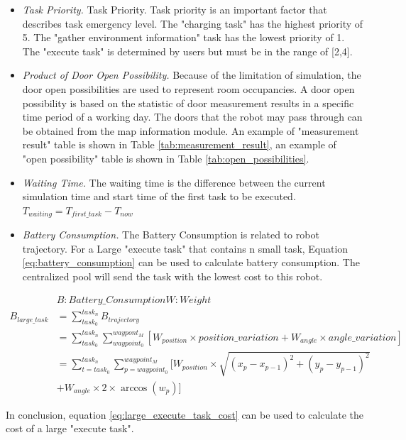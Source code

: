 \begin{itemize}
\item \textsl{Task Priority.} Task Priority. Task priority is an important factor that describes task emergency level. The "charging task" has the highest priority of 5. The "gather environment information" task has the lowest priority of 1. 
	The "execute task" is determined by users but must be in the range of [2,4]. 
\item \textsl{Product of Door Open Possibility.} Because of the limitation of simulation, the door open possibilities are used to represent room occupancies. A door open possibility is based on the statistic of door measurement results in a specific time period of a working day. 
	The doors that the robot may pass through can be obtained from the map information module.
	An example of "measurement result" table is shown in Table \ref{tab:measurement_result}, an example of "open possibility" table is shown in Table \ref{tab:open_possibilities}. 
\item \textsl{Waiting Time. } The waiting time is the difference between the current simulation time and start time of the first task to be executed. $T_{waiting} = T_{first\_task} - T_{now}$
\item \textsl{Battery Consumption.} The Battery Consumption is related to robot trajectory. For a Large "execute task" that contains n small task, Equation \ref{eq:battery_consumption} can be used to calculate battery consumption. The centralized pool will send the task with the lowest cost to this robot.
\end{itemize}
\begin{equation}
\begin{aligned}
\label{eq:battery_consumption}
&B: Battery\_Consumption W: Weight\\
B_{large\_task} & = \sum_{task_0}^{task_n} B_{trajectory} \\
& = \sum_{task_0}^{task_n} \sum_{waypoint_0}^{waypont_M} [W_{position} \times position\_variation+W_{angle}  \times angle\_variation]\\
& = \sum_{t = task_0}^{task_n} \sum_{p = waypoint_0}^{waypoint_M} [ W_{position} \times \sqrt{(x_p-x_{p-1} )^2+(y_p-y_{p-1} )^2} \\
&   + W_{angle} \times 2 \times \arccos(w_p)] 
\end{aligned}
\end{equation}

In conclusion, equation \ref{eq:large_execute_task_cost} can be used to calculate the cost of a large "execute task".

